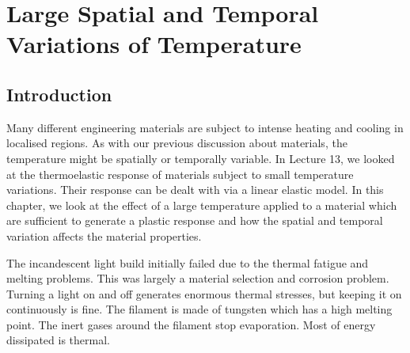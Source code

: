 \chapter{Large Spatial and Temporal Variations of Temperature}
\section{Introduction}
Many different engineering materials are subject to intense heating and cooling in localised regions. As with our previous discussion about materials, the temperature might be spatially or temporally variable. In Lecture 13, we looked at the thermoelastic response of materials subject to small temperature variations. Their response can be dealt with via a linear elastic model. In this chapter, we look at the effect of a large temperature applied to a material which are sufficient to generate a plastic response and how the spatial and temporal variation affects the material properties.

The incandescent light build initially failed due to the thermal fatigue and melting problems. This was largely a material selection and corrosion problem. Turning a light on and off generates enormous thermal stresses, but keeping it on continuously is fine. The filament is made of tungsten which has a high melting point. The inert gases around the filament stop evaporation. Most of energy dissipated is thermal.
